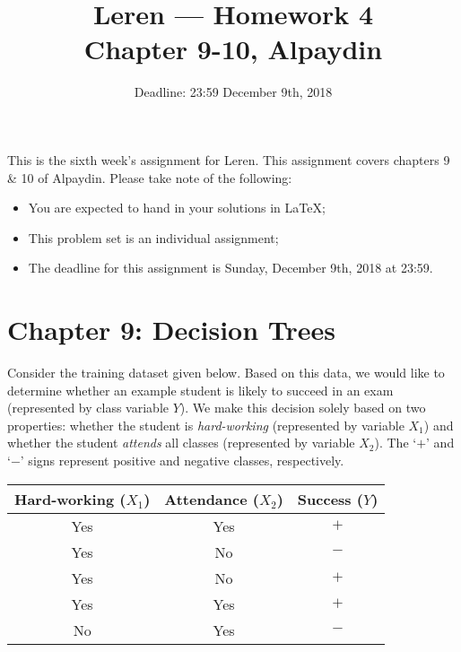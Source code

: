 \documentclass[11pt,a4paper]{article}
\title{Leren --- Homework 4\\[3mm]\small{Chapter 9-10, Alpaydin}}
\date{Deadline: 23:59 December 9th, 2018}
\begin{document}
\maketitle

This is the sixth week's assignment for Leren.  This assignment covers
chapters 9 \& 10 of Alpaydin. Please take note of the following:

\begin{itemize}
  \item You are expected to hand in your solutions in \LaTeX;
  \item This problem set is an individual assignment;
  \item The deadline for this assignment is Sunday, December 9th, 2018 at 23:59.
\end{itemize}


\section{Chapter 9: Decision Trees}

Consider the training dataset given below. Based on this data, we would like to determine whether an example student is likely to succeed in an exam (represented by class variable $Y$). We make this decision solely based on two properties: whether the student is \textit{hard-working} (represented by variable $X_{1}$) and whether the student \textit{attends} all classes (represented by variable $X_{2}$). The `$+$' and `$-$' signs represent positive and negative classes, respectively.

\begin{center}
\begin{tabular}{|c|c|c|}
\hline
Hard-working ($X_{1}$) & Attendance ($X_{2}$) &  Success ($Y$) \\ \hline
Yes & Yes & $+$ \\ \hline
Yes & No & $-$ \\ \hline
Yes & No & $+$ \\ \hline
Yes & Yes & $+$ \\ \hline
No & Yes & $-$ \\ \hline
\end{tabular}
\end{center}
\end{document}

